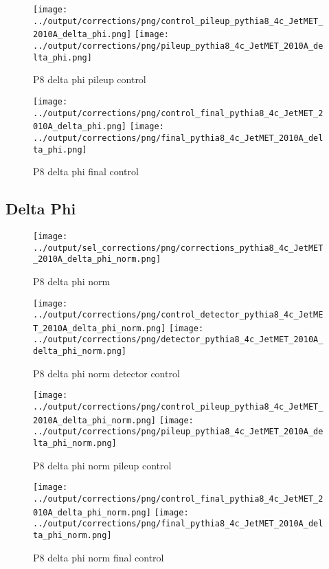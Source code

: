 \documentclass[11pt]{book}
\begin{document}
\begin{figure}[ht]
\centering
\texttt{[image: ../output/corrections/png/control\_pileup\_pythia8\_4c\_JetMET\_2010A\_delta\_phi.png]}
\texttt{[image: ../output/corrections/png/pileup\_pythia8\_4c\_JetMET\_2010A\_delta\_phi.png]}
\caption{P8 delta phi pileup control}
\label{fig:p8_JetMET_2010A_delta_phi_pileup_control}
\end{figure}


\begin{figure}[ht]
\centering
\texttt{[image: ../output/corrections/png/control\_final\_pythia8\_4c\_JetMET\_2010A\_delta\_phi.png]}
\texttt{[image: ../output/corrections/png/final\_pythia8\_4c\_JetMET\_2010A\_delta\_phi.png]}
\caption{P8 delta phi final control}
\label{fig:p8_JetMET_2010A_delta_phi_final_control}
\end{figure}

\subsection{Delta Phi}
\begin{figure}[ht]
\centering
\texttt{[image: ../output/sel\_corrections/png/corrections\_pythia8\_4c\_JetMET\_2010A\_delta\_phi\_norm.png]}
\caption{P8 delta phi norm}
\label{fig:p8_JetMET_2010A_delta_phi_norm}
\end{figure}

\begin{figure}[ht]
\centering
\texttt{[image: ../output/corrections/png/control\_detector\_pythia8\_4c\_JetMET\_2010A\_delta\_phi\_norm.png]}
\texttt{[image: ../output/corrections/png/detector\_pythia8\_4c\_JetMET\_2010A\_delta\_phi\_norm.png]}
\caption{P8 delta phi norm detector control}
\label{fig:p8_JetMET_2010A_delta_phi_norm_detector_control}
\end{figure}

\begin{figure}[ht]
\centering
\texttt{[image: ../output/corrections/png/control\_pileup\_pythia8\_4c\_JetMET\_2010A\_delta\_phi\_norm.png]}
\texttt{[image: ../output/corrections/png/pileup\_pythia8\_4c\_JetMET\_2010A\_delta\_phi\_norm.png]}
\caption{P8 delta phi norm pileup control}
\label{fig:p8_JetMET_2010A_delta_phi_norm_pileup_control}
\end{figure}


\begin{figure}[ht]
\centering
\texttt{[image: ../output/corrections/png/control\_final\_pythia8\_4c\_JetMET\_2010A\_delta\_phi\_norm.png]}
\texttt{[image: ../output/corrections/png/final\_pythia8\_4c\_JetMET\_2010A\_delta\_phi\_norm.png]}
\caption{P8 delta phi norm final control}
\label{fig:p8_JetMET_2010A_delta_phi_norm_final_control}
\end{figure}
\end{document}
